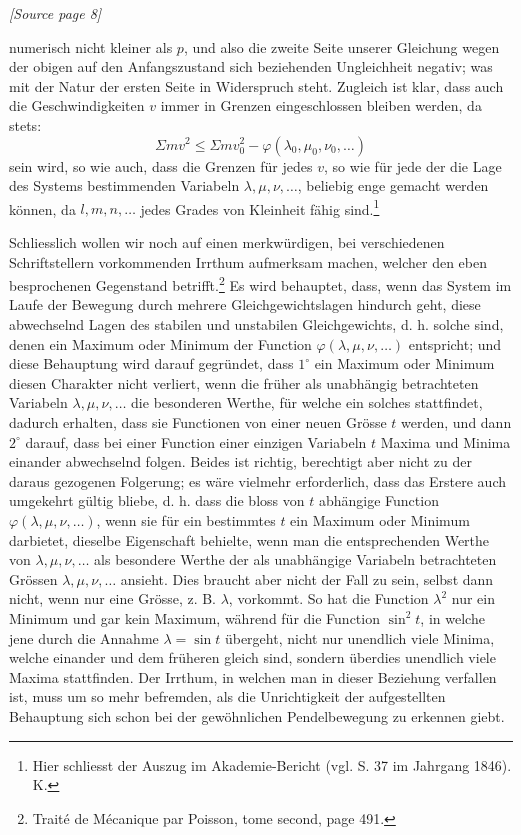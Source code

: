 \documentclass[11pt]{article}
\newcommand{\sourcepage}[1]{\par\smallskip\noindent\textit{[Source page #1]}\par\smallskip}
\begin{document}
\sourcepage{8}

\noindent numerisch nicht kleiner als $p$, und also die zweite Seite unserer Gleichung wegen der obigen auf den Anfangszustand sich beziehenden Ungleichheit negativ; was mit der Natur der ersten Seite in Widerspruch steht. Zugleich ist klar, dass auch die Geschwindigkeiten $v$ immer in Grenzen eingeschlossen bleiben werden, da stets:
\[
\Sigma m v^2 \leq \Sigma m v_0^2-\varphi(\lambda_0,\mu_0,\nu_0,\ldots)
\]
sein wird, so wie auch, dass die Grenzen für jedes $v$, so wie für jede der die Lage des Systems bestimmenden Variabeln $\lambda,\mu,\nu,\ldots$, beliebig enge gemacht werden können, da $l,m,n,\ldots$ jedes Grades von Kleinheit fähig sind.\footnote{Hier schliesst der Auszug im Akademie-Bericht (vgl. S. 37 im Jahrgang 1846). K.}

Schliesslich wollen wir noch auf einen merkwürdigen, bei verschiedenen Schriftstellern vorkommenden Irrthum aufmerksam machen, welcher den eben besprochenen Gegenstand betrifft.\footnote{Traité de Mécanique par Poisson, tome second, page 491.} Es wird behauptet, dass, wenn das System im Laufe der Bewegung durch mehrere Gleichgewichtslagen hindurch geht, diese abwechselnd Lagen des stabilen und unstabilen Gleichgewichts, d. h. solche sind, denen ein Maximum oder Minimum der Function $\varphi(\lambda,\mu,\nu,\ldots)$ entspricht; und diese Behauptung wird darauf gegründet, dass $1^\circ$ ein Maximum oder Minimum diesen Charakter nicht verliert, wenn die früher als unabhängig betrachteten Variabeln $\lambda,\mu,\nu,\ldots$ die besonderen Werthe, für welche ein solches stattfindet, dadurch erhalten, dass sie Functionen von einer neuen Grösse $t$ werden, und dann $2^\circ$ darauf, dass bei einer Function einer einzigen Variabeln $t$ Maxima und Minima einander abwechselnd folgen. Beides ist richtig, berechtigt aber nicht zu der daraus gezogenen Folgerung; es wäre vielmehr erforderlich, dass das Erstere auch umgekehrt gültig bliebe, d. h. dass die bloss von $t$ abhängige Function $\varphi(\lambda,\mu,\nu,\ldots)$, wenn sie für ein bestimmtes $t$ ein Maximum oder Minimum darbietet, dieselbe Eigenschaft behielte, wenn man die entsprechenden Werthe von $\lambda,\mu,\nu,\ldots$ als besondere Werthe der als unabhängige Variabeln betrachteten Grössen $\lambda,\mu,\nu,\ldots$ ansieht. Dies braucht aber nicht der Fall zu sein, selbst dann nicht, wenn nur eine Grösse, z. B. $\lambda$, vorkommt. So hat die Function $\lambda^2$ nur ein Minimum und gar kein Maximum, während für die Function $\sin^2 t$, in welche jene durch die Annahme $\lambda=\sin t$ übergeht, nicht nur unendlich viele Minima, welche einander und dem früheren gleich sind, sondern überdies unendlich viele Maxima stattfinden. Der Irrthum, in welchen man in dieser Beziehung verfallen ist, muss um so mehr befremden, als die Unrichtigkeit der aufgestellten Behauptung sich schon bei der gewöhnlichen Pendelbewegung zu erkennen giebt.
\end{document}
